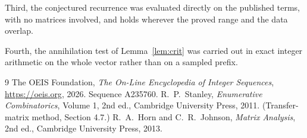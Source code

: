 \documentclass[11pt,a4paper]{article}
\theoremstyle{plain}
\theoremstyle{definition}
\begin{document}
Third, the conjectured recurrence was evaluated directly on the published terms, with no
matrices involved, and holds wherever the proved range and the data overlap.

Fourth, the annihilation test of Lemma~\ref{lem:crit} was carried out in exact integer
arithmetic on the whole vector rather than on a sampled prefix.

\begin{thebibliography}{9}
 The OEIS Foundation, \emph{The On-Line Encyclopedia of Integer
Sequences}, \url{https://oeis.org}, 2026. Sequence A235760.
 R.~P.~Stanley, \emph{Enumerative Combinatorics}, Volume 1, 2nd ed.,
Cambridge University Press, 2011. (Transfer-matrix method, Section 4.7.)
 R.~A.~Horn and C.~R.~Johnson, \emph{Matrix Analysis}, 2nd ed., Cambridge
University Press, 2013.
\end{thebibliography}
\end{document}
